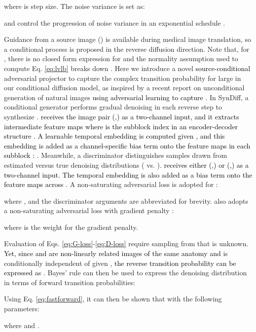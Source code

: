 \documentclass[journal,twoside,web]{ieeecolor}
\newcommand*{\revhl}{\textcolor{black}}
\begin{document}
where  is step size. The noise variance  is set as:

 and  control the progression of noise variance in an exponential schedule \cite{song2020score}. 

Guidance from a source image () is available during medical image translation, so a conditional process is proposed in the reverse diffusion direction. Note that, for , there is no closed form expression for  and the normality assumption used to compute Eq. \ref{eq:lvlb} breaks down \cite{DDPM}. Here we introduce a novel \revhl{source-conditional} adversarial projector to capture the complex transition probability  for large  in our conditional diffusion model, as inspired by a recent report on unconditional generation of natural images \revhl{using adversarial learning to capture } \cite{DiffNvidia}. In SynDiff, a conditional generator  performs gradual denoising in each reverse step to synthesize . \revhl{ receives the image pair (,) as a two-channel input, and it extracts intermediate feature maps  where  is the subblock index in an encoder-decoder structure \cite{song2020score}. A learnable temporal embedding  is computed given , and this embedding is added as a channel-specific bias term onto the feature maps in each subblock \cite{song2020score}: .} Meanwhile, a discriminator  distinguishes samples drawn from estimated versus true denoising distributions ( vs. ). \revhl{ receives either (,) or (,) as a two-channel input. The temporal embedding  is also added as a bias term onto the feature maps across .} A non-saturating adversarial loss is adopted for  \cite{goodfellow2014generative}: 

where , and the discriminator arguments are abbreviated for brevity.  also adopts a non-saturating adversarial loss with gradient penalty \cite{mescheder2018training}:

where  is the weight for the gradient penalty.

Evaluation of Eqs. \ref{eq:G-loss}-\ref{eq:D-loss} require sampling from  that is unknown. \revhl{Yet, since  and  are non-linearly related images of the same anatomy and}  is conditionally independent of  given , \revhl{the reverse transition probability can be expressed as}  \cite{DDPM}. Bayes' rule can then be used to express the denoising distribution in terms of forward transition probabilities:

Using Eq. \ref{eq:fastforward}, it can then be shown that  with the following parameters: 

where  and . 
\end{document}
